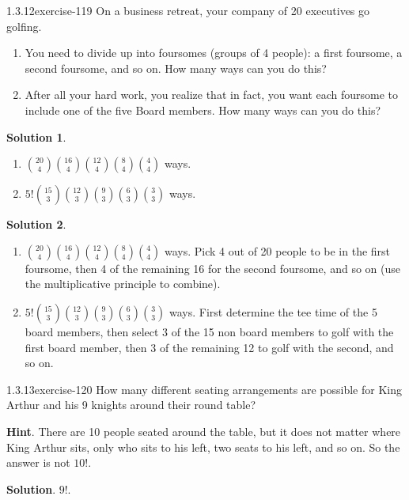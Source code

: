 \documentclass[twoside,11pt,]{book}
\numberwithin{equation}{chapter}
\begin{document}
\begin{divisionsolution}{1.3.12}{}{exercise-119}%
\hypertarget{p-1952}{}%
On a business retreat, your company of 20 executives go golfing.\leavevmode%
\begin{enumerate}[label=(\alph*)]
\item\hypertarget{li-1266}{}\hypertarget{p-1953}{}%
You need to divide up into foursomes (groups of 4 people): a first foursome, a second foursome, and so on. How many ways can you do this?%
\item\hypertarget{li-1267}{}\hypertarget{p-1955}{}%
After all your hard work, you realize that in fact, you want each foursome to include one of the five Board members. How many ways can you do this?%
\end{enumerate}
%
\par\smallskip%
\noindent\textbf{Solution 1}.\quad%
\hypertarget{p-1957}{}%
\leavevmode%
\begin{enumerate}[label=(\alph*)]
\item\hypertarget{li-1268}{}\hypertarget{p-1958}{}%
\({20 \choose 4}{16 \choose 4}{12 \choose 4}{8 \choose 4}{4 \choose 4}\) ways.%
\item\hypertarget{li-1269}{}\hypertarget{p-1959}{}%
\(5!{15 \choose 3}{12 \choose 3}{9 \choose 3}{6 \choose 3}{3 \choose 3}\) ways.%
\end{enumerate}
%
\par\smallskip%
\noindent\textbf{Solution 2}.\quad%
\hypertarget{p-1960}{}%
\leavevmode%
\begin{enumerate}[label=(\alph*)]
\item\hypertarget{li-1270}{}\hypertarget{p-1961}{}%
\({20 \choose 4}{16 \choose 4}{12 \choose 4}{8 \choose 4}{4 \choose 4}\) ways. Pick 4 out of 20 people to be in the first foursome, then 4 of the remaining 16 for the second foursome, and so on (use the multiplicative principle to combine).%
\item\hypertarget{li-1271}{}\hypertarget{p-1962}{}%
\(5!{15 \choose 3}{12 \choose 3}{9 \choose 3}{6 \choose 3}{3 \choose 3}\) ways. First determine the tee time of the 5 board members, then select 3 of the 15 non board members to golf with the first board member, then 3 of the remaining 12 to golf with the second, and so on.%
\end{enumerate}
%
\end{divisionsolution}%
\begin{divisionsolution}{1.3.13}{}{exercise-120}%
\hypertarget{p-1967}{}%
How many different seating arrangements are possible for King Arthur and his 9 knights around their round table?%
\par\smallskip%
\noindent\textbf{Hint}.\quad%
\hypertarget{p-1969}{}%
There are 10 people seated around the table, but it does not matter where King Arthur sits, only who sits to his left, two seats to his left, and so on.  So the answer is not \(10!\text{.}\)%
\par\smallskip%
\noindent\textbf{Solution}.\quad%
\hypertarget{p-1970}{}%
\(9!\text{.}\)%
\end{divisionsolution}%
\end{document}
